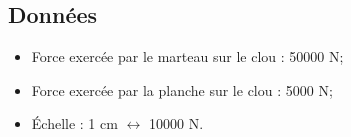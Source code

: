 \subsection*{Données}
	\begin{itemize}
		\item Force exercée par le marteau sur le clou : \num{50000} N;
		\item Force exercée par la planche sur le clou : \num{5000} N;
		\item \'Echelle : 1 cm $\leftrightarrow$ \num{10000} N.
	\end{itemize}